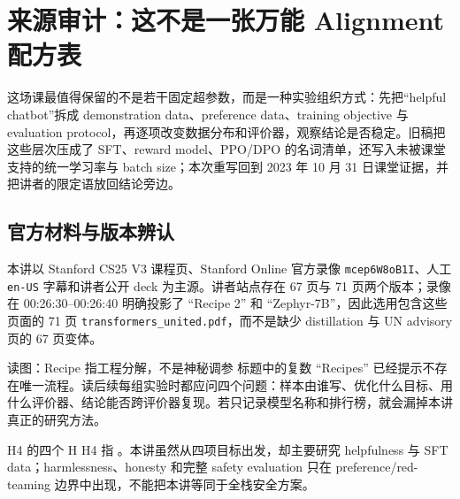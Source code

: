 \section{来源审计：这不是一张万能 Alignment 配方表}

这场课最值得保留的不是若干固定超参数，而是一种实验组织方式：先把“helpful chatbot”拆成 demonstration data、preference data、training objective 与 evaluation protocol，再逐项改变数据分布和评价器，观察结论是否稳定。旧稿把这些层次压成了 SFT、reward model、PPO/DPO 的名词清单，还写入未被课堂支持的统一学习率与 batch size；本次重写回到 2023 年 10 月 31 日课堂证据，并把讲者的限定语放回结论旁边。

\subsection{官方材料与版本辨认}

本讲以 Stanford CS25 V3 课程页、Stanford Online 官方录像 \texttt{mcep6W8oB1I}、人工 \texttt{en-US} 字幕和讲者公开 deck 为主源。讲者站点存在 67 页与 71 页两个版本；录像在 00:26:30--00:26:40 明确投影了 ``Recipe 2'' 和 ``Zephyr-7B''，因此选用包含这些页面的 71 页 \texttt{transformers\_united.pdf}，而不是缺少 distillation 与 UN advisory 页的 67 页变体。


\begin{knowledgebox}{读图：Recipe 指工程分解，不是神秘调参}
标题中的复数 ``Recipes'' 已经提示不存在唯一流程。读后续每组实验时都应问四个问题：样本由谁写、优化什么目标、用什么评价器、结论能否跨评价器复现。若只记录模型名称和排行榜，就会漏掉本讲真正的研究方法。
\end{knowledgebox}


\begin{importantbox}{H4 的四个 H}
H4 指 。本讲虽然从四项目标出发，却主要研究 helpfulness 与 SFT data；harmlessness、honesty 和完整 safety evaluation 只在 preference/red-teaming 边界中出现，不能把本讲等同于全栈安全方案。
\end{importantbox}


